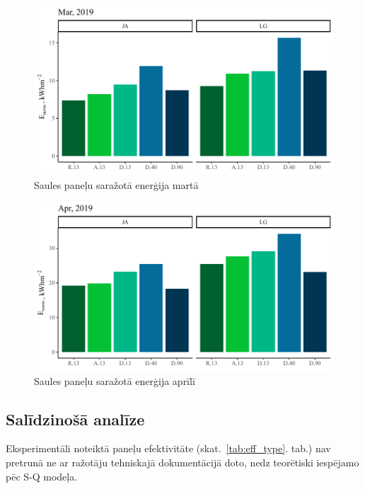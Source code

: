 \begin{figure}[h]
    \centering
    \includegraphics[width=\linewidth]{figures/sol_month/mar_m_m2.pdf}
    \caption{Saules paneļu saražotā enerģija martā}
    \label{fig:mar_sum}
\end{figure}

\begin{figure}[h]
    \centering
    \includegraphics[width=\linewidth]{figures/sol_month/apr_m_m2.pdf}
    \caption{Saules paneļu saražotā enerģija aprīlī}
    \label{fig:apr_sum}
\end{figure}


\subsection{Salīdzinošā analīze}\label{subsection:effectivity}

Eksperimentāli noteiktā paneļu efektivitāte (skat.~\ref{tab:eff_type}. tab.) nav pretrunā ne ar ražotāju tehniskajā dokumentācijā doto, nedz teorētiski iespējamo pēc S-Q modeļa. 

